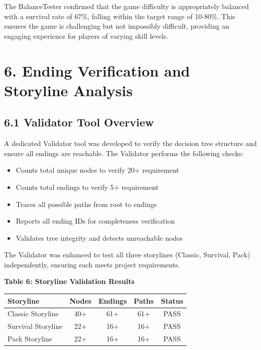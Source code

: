 \documentclass[12pt,a4paper]{article}
\begin{document}
The BalanceTester confirmed that the game difficulty is appropriately balanced with a survival rate of 67\%, falling within the target range of 10-80\%. This ensures the game is challenging but not impossibly difficult, providing an engaging experience for players of varying skill levels.

\section[6. Ending Verification and Storyline Analysis]{6. Ending Verification and Storyline Analysis}

\subsection{6.1 Validator Tool Overview}
A dedicated Validator tool was developed to verify the decision tree structure and ensure all endings are reachable. The Validator performs the following checks:
\begin{itemize}
	\item Counts total unique nodes to verify 20+ requirement
	\item Counts total endings to verify 5+ requirement
	\item Traces all possible paths from root to endings
	\item Reports all ending IDs for completeness verification
	\item Validates tree integrity and detects unreachable nodes
\end{itemize}

The Validator was enhanced to test all three storylines (Classic, Survival, Pack) independently, ensuring each meets project requirements.

\textbf{Table 6: Storyline Validation Results}
\begin{center}
	\begin{tabular}{@{}lcccc@{}}
		\toprule
		\textbf{Storyline} & \textbf{Nodes} & \textbf{Endings} & \textbf{Paths} & \textbf{Status} \\ \midrule
		Classic Storyline  & 40+            & 61+              & 61+            & \checkmark PASS \\
		Survival Storyline & 22+            & 16+              & 16+            & \checkmark PASS \\
		Pack Storyline     & 22+            & 16+              & 16+            & \checkmark PASS \\
		\bottomrule
	\end{tabular}
\end{center}
\end{document}
